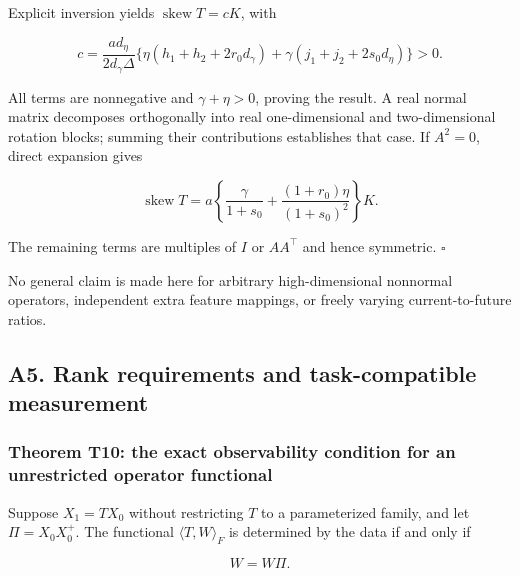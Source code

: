 \documentclass[11pt,a4paper]{article}
\begin{document}
\par
\noindent\begin{minipage}{\linewidth}

Explicit inversion yields \(\operatorname{skew}T=cK\), with

\[
c=\frac{a d_\eta}{2d_\gamma\Delta}
\{\eta(h_1+h_2+2r_0d_\gamma)
+\gamma(j_1+j_2+2s_0d_\eta)\}>0.
\]

\end{minipage}\par

\par
\noindent\begin{minipage}{\linewidth}

All terms are nonnegative and \(\gamma+\eta>0\), proving the result. A
real normal matrix decomposes orthogonally into real one-dimensional and
two-dimensional rotation blocks; summing their contributions establishes
that case. If \(A^2=0\), direct expansion gives

\[
\operatorname{skew}T
=a\left\{\frac{\gamma}{1+s_0}
+\frac{(1+r_0)\eta}{(1+s_0)^2}\right\}K.
\]

\end{minipage}\par

The remaining terms are multiples of \(I\) or \(AA^\top\) and hence
symmetric. \(\square\)

No general claim is made here for arbitrary high-dimensional nonnormal
operators, independent extra feature mappings, or freely varying
current-to-future ratios.

\subsection{A5. Rank requirements and task-compatible
measurement}\label{a5.-rank-requirements-and-task-compatible-measurement}

\subsubsection{Theorem T10: the exact observability condition for an
unrestricted operator
functional}\label{theorem-t10-the-exact-observability-condition-for-an-unrestricted-operator-functional}

\par
\noindent\begin{minipage}{\linewidth}

Suppose \(X_1=TX_0\) without restricting \(T\) to a parameterized
family, and let \(\Pi=X_0X_0^+\). The functional
\(\langle T,W\rangle_F\) is determined by the data if and only if

\[
W=W\Pi.
\]

\end{minipage}\par
\end{document}
